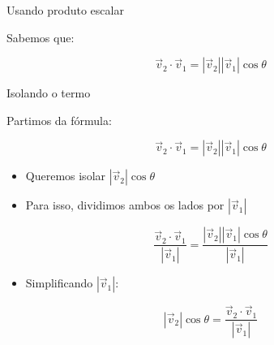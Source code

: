 \documentclass{beamer}
\begin{document}
\begin{frame}{Usando produto escalar}

Sabemos que:

\[
\vec{v}_2 \cdot \vec{v}_1 = |\vec{v}_2||\vec{v}_1|\cos\theta
\]
\end{frame}
\begin{frame}{Isolando o termo}


\vspace{0.5cm}

Partimos da fórmula:

\[
\vec{v}_2 \cdot \vec{v}_1 = |\vec{v}_2||\vec{v}_1|\cos\theta
\]

\vspace{0.5cm}

\begin{itemize}
    \item Queremos isolar $|\vec{v}_2|\cos\theta$
    \item Para isso, dividimos ambos os lados por $|\vec{v}_1|$
\end{itemize}

\vspace{0.5cm}

\[
\frac{\vec{v}_2 \cdot \vec{v}_1}{|\vec{v}_1|}
=
\frac{|\vec{v}_2||\vec{v}_1|\cos\theta}{|\vec{v}_1|}
\]

\vspace{0.5cm}

\begin{itemize}
    \item Simplificando $|\vec{v}_1|$:
\end{itemize}


\[
|\vec{v}_2|\cos\theta =
\frac{\vec{v}_2 \cdot \vec{v}_1}{|\vec{v}_1|}
\]

\end{frame}
\end{document}
